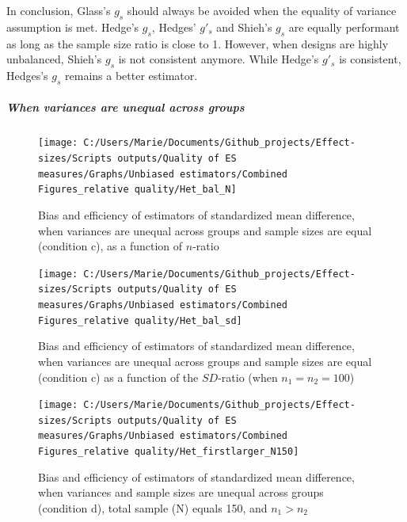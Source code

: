 \documentclass[
  man,floatsintext]{apa6}
\begin{document}
In conclusion, Glass's \(g_s\) should always be avoided when the equality of variance assumption is met. Hedge's \(g_s\), Hedges' \(g'_s\) and Shieh's \(g_s\) are equally performant as long as the sample size ratio is close to 1. However, when designs are highly unbalanced, Shieh's \(g_s\) is not consistent anymore. While Hedge's \(g'_s\) is consistent, Hedges's \(g_s\) remains a better estimator.

\hypertarget{when-variances-are-unequal-across-groups}{%
\subparagraph{When variances are unequal across groups}\label{when-variances-are-unequal-across-groups}}

\begin{figure}

{\centering \texttt{[image: C:/Users/Marie/Documents/Github\_projects/Effect-sizes/Scripts outputs/Quality of ES measures/Graphs/Unbiased estimators/Combined Figures\_relative quality/Het\_bal\_N]} 

}

\caption{Bias and efficiency of estimators of standardized mean difference, when variances are unequal across groups and sample sizes are equal (condition c), as a function of $n$-ratio}\label{fig:idHetbal1}
\end{figure}

\begin{figure}

{\centering \texttt{[image: C:/Users/Marie/Documents/Github\_projects/Effect-sizes/Scripts outputs/Quality of ES measures/Graphs/Unbiased estimators/Combined Figures\_relative quality/Het\_bal\_sd]} 

}

\caption{Bias and efficiency of estimators of standardized mean difference, when variances are unequal across groups and sample sizes are equal (condition c) as a function of the $SD$-ratio (when $n_1=n_2=100$)}\label{fig:idHetbal2}
\end{figure}

\begin{figure}

{\centering \texttt{[image: C:/Users/Marie/Documents/Github\_projects/Effect-sizes/Scripts outputs/Quality of ES measures/Graphs/Unbiased estimators/Combined Figures\_relative quality/Het\_firstlarger\_N150]} 

}

\caption{Bias and efficiency of estimators of standardized mean difference, when variances and sample sizes are unequal across groups (condition d), total sample (N) equals 150, and $n_1>n_2$}\label{fig:idHetunbal1}
\end{figure}
\end{document}
